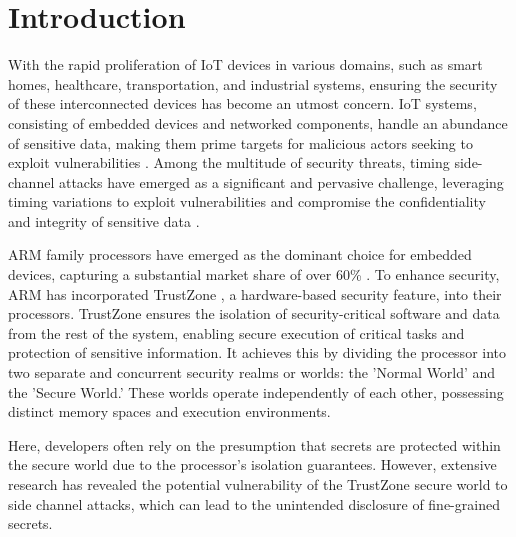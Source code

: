 \section{Introduction} \label{sect:intro3}

With the rapid proliferation of \ac{IoT} devices in various domains, such
as smart homes, healthcare, transportation, and industrial systems,
ensuring the security of these interconnected devices has become an utmost
concern. \ac{IoT} systems, consisting of embedded devices and networked
components, handle an abundance of sensitive data, making them prime
targets for malicious actors seeking to exploit vulnerabilities
\cite{IOTSecurity1, IOTSecurity2}. Among the multitude of security threats,
timing side-channel attacks have emerged as a significant and pervasive
challenge, leveraging timing variations to exploit vulnerabilities and
compromise the confidentiality and integrity of sensitive data
\cite{timingattack, Nemesis, Cache1, brumley2011remote, Travis, busted}.  

ARM family processors have emerged as the dominant choice for embedded
devices, capturing a substantial market share of over 60\%
\cite{arm_qualcomm}. To enhance security, ARM has incorporated TrustZone
\cite{TZM, DemystifyingAT}, a hardware-based security feature, into their
processors. TrustZone ensures the isolation of security-critical software
and data from the rest of the system, enabling secure execution of critical
tasks and protection of sensitive information. It achieves this by dividing
the processor into two separate and concurrent security realms or worlds:
the 'Normal World' and the 'Secure World.' These worlds operate
independently of each other, possessing distinct memory spaces and
execution environments. 

Here, developers often rely on the presumption that secrets are protected
within the secure world due to the processor's isolation guarantees.
However, extensive research \cite{surveyonTEE, DemystifyingAT, loadstep,
truspy, Bypassed, Qualcomm, busted} has revealed the potential
vulnerability of the TrustZone secure world to side channel attacks, which
can lead to the unintended disclosure of fine-grained secrets. 


